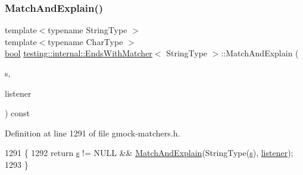 \mbox{\label{classtesting_1_1internal_1_1EndsWithMatcher_aadb9ad4734e0a3540b1674b1716c22e2}} 
\subsubsection{\texorpdfstring{Match\+And\+Explain()}{MatchAndExplain()}\hspace{0.1cm}{\footnotesize\ttfamily [1/2]}}
{\footnotesize\ttfamily template$<$typename String\+Type $>$ \\
template$<$typename Char\+Type $>$ \\
\hyperlink{classbool}{bool} \hyperlink{classtesting_1_1internal_1_1EndsWithMatcher}{testing\+::internal\+::\+Ends\+With\+Matcher}$<$ String\+Type $>$\+::Match\+And\+Explain (\begin{DoxyParamCaption}\item[{Char\+Type $\ast$}]{s,  }\item[{\hyperlink{classtesting_1_1MatchResultListener}{Match\+Result\+Listener} $\ast$}]{listener }\end{DoxyParamCaption}) const\hspace{0.3cm}{\ttfamily [inline]}}



Definition at line 1291 of file gmock-\/matchers.\+h.


\begin{DoxyCode}
1291                                                                          \{
1292     \textcolor{keywordflow}{return} \hyperlink{namespaceservice__node__3_aa976421a49e0b54f23833423400849ae}{s} != NULL && \hyperlink{classtesting_1_1internal_1_1EndsWithMatcher_aadb9ad4734e0a3540b1674b1716c22e2}{MatchAndExplain}(StringType(\hyperlink{namespaceservice__node__3_aa976421a49e0b54f23833423400849ae}{s}), \hyperlink{namespaceinteractive__marker_a0e579ab555212bb5e2c9f8a675b7618a}{listener});
1293   \}
\end{DoxyCode}
\mbox{\label{classtesting_1_1internal_1_1EndsWithMatcher_a0d3b4f762a3172bb378671a9e6863891}} 
